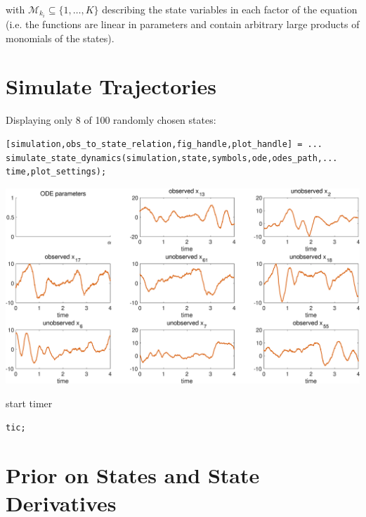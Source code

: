 \noindent with $\mathcal{M}_{k_i} \subseteq \{ 1, \dots, K\}$ describing the state variables in each factor of the equation (i.e. the functions are linear in parameters and contain arbitrary large products of monomials of the states).


\section{Simulate Trajectories}

Displaying only 8 of 100 randomly chosen states:
\color{RoyalPurple}\begin{verbatim}
[simulation,obs_to_state_relation,fig_handle,plot_handle] = ...
simulate_state_dynamics(simulation,state,symbols,ode,odes_path,...
time,plot_settings);
\end{verbatim} 
\color{black}

{
\centering
\includegraphics [width=5.5in]{VGM_for_Lorenz96_01.eps}

}
\begin{par}
start timer
\end{par} \vspace{1em}
\color{RoyalPurple}\begin{verbatim}
tic;
\end{verbatim} 
\color{black}


\section{Prior on States and State Derivatives}

